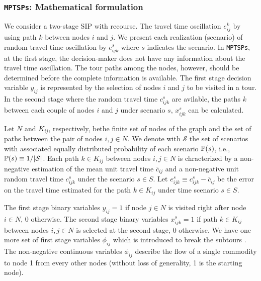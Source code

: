 \subsubsection{\texttt{MPTSPs}: Mathematical formulation}
We consider a two-stage SIP with recourse. The travel time oscillation $e_{ij}^k$ by using path $k$ between nodes $i$ and $j$. We present each realization (scenario) of random travel time oscillation by $e_{ijk}^{s}$ where $s$ indicates the scenario. In \texttt{MPTSPs}, at the first stage, the decision-maker does not have any information about the travel time oscillation. The tour paths among the nodes, however, should be determined before the complete information is available. The first stage decision variable $y_{ij}$ is represented by the selection of nodes $i$ and $j$ to be visited in a tour. In the second stage where the random travel time $c_{ijk}^{s}$ are avilable, the paths $k$ between each couple of nodes $i$ and $j$ under scenario $s$, $x_{ijk}^{s}$ can be calculated. 

Let $N$ and $K_{ij}$, respectively, bethe finite set of nodes of the graph and the set of paths between the pair of nodes $i,j\in N$. We denote with $\mathcal{S}$ the set of scenarios with associated equally distributed probability of each scenario $\operatorname*{\mathbb{P}}(s)$, i.e., $\operatorname*{\mathbb{P}}(s)\equiv 1/|\mathcal{S}|$. Each path $k\in K_{ij}$ between nodes $i,j\in N$ is chracterized by a non-negative estimation of the mean unit travel time $\bar{c}_{ij}$ and a non-negative unit random travel time $c_{ijk}^{s}$ under the scenario $s\in S$. Let $e_{ijk}^{s}\equiv c_{ijk}^{s}-\bar{c}_{ij}$ be the error on the travel time estimated for the path $k\in K_{ij}$ under time scenario $s\in S$.

The first stage binary variables $y_{ij}=1$ if node $j\in N$ is visited right after node $i\in N$, 0 otherwise. The second stage binary variables $x_{ijk}^{s}=1$ if path $k\in K_{ij}$ between nodes $i,j\in N$ is selected at the second stage, 0 otherwise. We have one more set of first stage variables $\phi_{ij}$ which is introduced to break the subtours \cite{journal:LSD1990}. The non-negative continuous variables $\phi_{ij}$ describe the flow of a single commodity to node 1 from every other nodes (without loss of generality, 1 is the starting node). 

